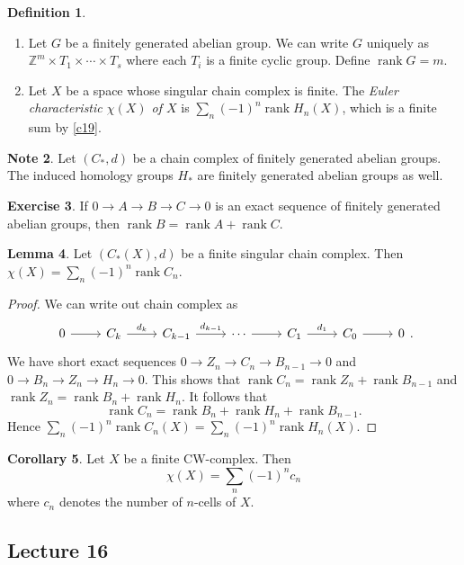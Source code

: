 \documentclass[10pt,letterpaper,cm]{nupset}
\theoremstyle{definition}
\newtheorem{definition}{Definition}[subsection]
\newtheorem{note}[definition]{Note}
\theoremstyle{theorem}
\newtheorem{lemma}[definition]{Lemma}
\newtheorem{corollary}[definition]{Corollary}
\newtheorem{exercise}[definition]{Exercise}
\theoremstyle{remark}
\newcommand{\Z}{\mathbb Z}
\newcommand{\1}{\mathbb{1}}
\newcommand{\0}{\vec 0}
\DeclareMathOperator{\rnk}{rank}
\begin{document}
\begin{definition} $ $
\begin{enumerate}
\item Let $G$ be a finitely generated abelian group. We can write $G$ uniquely as  $\Z^m \times T_1 \times \cdots \times T_s$ where each $T_i$ is a  finite cyclic group. Define $\rnk{G} = m$.
\item Let $X$ be a space whose singular chain complex is finite. The \textit{Euler characteristic $\chi(X)$ of $X$} is $ \sum_n({-}1)^n\rnk{H_n(X)}$, which is a finite sum by \cref{c19}.
\end{enumerate}
\end{definition}

\begin{note}
Let $(C_{\ast}, d)$ be a chain complex of finitely generated abelian groups. The induced homology groups $H_{\ast}$ are finitely generated abelian groups as well. 
\end{note}

\begin{exercise}
If $0 \to A \to B \to C \to 0$ is an exact sequence of finitely generated abelian groups, then $\rnk{B}= \rnk{A} + \rnk{C}$.
\end{exercise}

\begin{lemma}
Let $(C_{\ast}(X), d)$ be a finite singular chain complex. Then $\chi(X) =\sum_n ({-}1)^n\rnk{C_n}$.
\end{lemma}
\begin{proof}
We can write out chain complex as
\[\begin{tikzcd}
0 \arrow[r] & C_k \arrow[r, "d_k"] & C_{k-1} \arrow[r, "d_{k-1}"] & \cdots \arrow[r] & C_1 \arrow[r, "d_1"] & C_0 \arrow[r] & 0
\end{tikzcd}
.\] We have short exact sequences $0 \to Z_n \to C_n \to B_{n-1} \to 0$ and $0 \to B_n \to Z_n \to H_n \to 0$. This shows that $\rnk{C_n}= \rnk{Z_n} +\rnk{B_{n-1}}$ and $\rnk{Z_n} = \rnk{B_n} + \rnk{H_n}$. It follows that $$\rnk{C_n}=  \rnk{B_n} + \rnk{H_n}  +\rnk{B_{n-1}}  .  $$ Hence $ \sum_n({-}1)^n\rnk{C_n(X)} =  \sum_n({-}1)^n\rnk{H_n(X)}$.
\end{proof}

\begin{corollary}
 Let $X$ be a finite CW-complex. Then $$\chi(X) = \sum_{n} ({-}1)^nc_n$$ where $c_n$ denotes the number of $n$-cells of $X$.
\end{corollary}

\subsection{Lecture 16}
\end{document}

